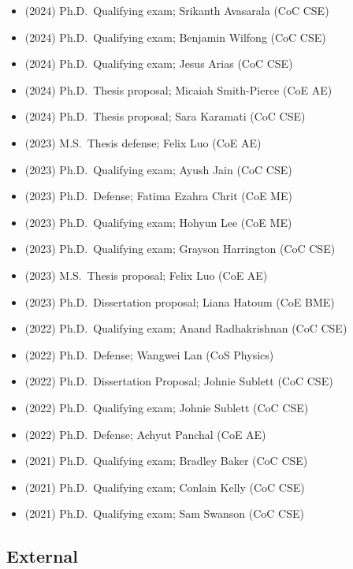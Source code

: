 \begin{itemize}
    \item (2024) Ph.D.\ Qualifying exam; Srikanth Avasarala (CoC CSE)
    \item (2024) Ph.D.\ Qualifying exam; Benjamin Wilfong (CoC CSE)
    \item (2024) Ph.D.\ Qualifying exam; Jesus Arias (CoC CSE)
    \item (2024) Ph.D.\ Thesis proposal; Micaiah Smith-Pierce (CoE AE)
    \item (2024) Ph.D.\ Thesis proposal; Sara Karamati (CoC CSE)
    \item (2023) M.S.\  Thesis defense; Felix Luo (CoE AE)
    \item (2023) Ph.D.\ Qualifying exam; Ayush Jain (CoC CSE)
    \item (2023) Ph.D.\ Defense; Fatima Ezahra Chrit (CoE ME)
    \item (2023) Ph.D.\ Qualifying exam; Hohyun Lee (CoE ME)
    \item (2023) Ph.D.\ Qualifying exam; Grayson Harrington (CoC CSE)
    \item (2023) M.S.\  Thesis proposal; Felix Luo (CoE AE)
    \item (2023) Ph.D.\ Dissertation proposal; Liana Hatoum (CoE BME)
    \item (2022) Ph.D.\ Qualifying exam; Anand Radhakrishnan (CoC CSE)
    \item (2022) Ph.D.\ Defense; Wangwei Lan (CoS Physics)
    \item (2022) Ph.D.\ Dissertation Proposal; Johnie Sublett (CoC CSE)
    \item (2022) Ph.D.\ Qualifying exam; Johnie Sublett (CoC CSE)
    \item (2022) Ph.D.\ Defense; Achyut Panchal (CoE AE)
    \item (2021) Ph.D.\ Qualifying exam; Bradley Baker (CoC CSE)
    \item (2021) Ph.D.\ Qualifying exam; Conlain Kelly (CoC CSE)
    \item (2021) Ph.D.\ Qualifying exam; Sam Swanson (CoC CSE)
\end{itemize}

\subsection{External}

